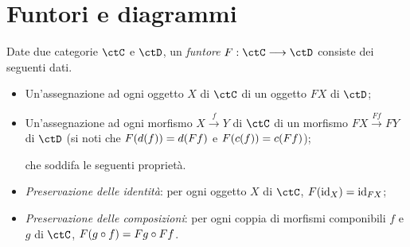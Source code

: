 \section{Funtori e diagrammi}\label{sec_funtori}

\begin{definition}[Funtore]\label{def_funtore}
	Date due categorie \(\ctC\) e \(\ctD\), un \emph{funtore} \(F:\ctC\fun\ctD\) consiste dei seguenti dati.
	\begin{itemize}
		\item Un'assegnazione ad ogni oggetto \(X\) di \(\ctC\) di un oggetto \(FX\) di \(\ctD\);
		\item Un'assegnazione ad ogni morfismo \(X \xrightarrow{f} Y\) di \(\ctC\) di un morfismo \(FX \xrightarrow{Ff} FY\) di \(\ctD\) (si noti che \(F(d(f))=d(Ff)\) e \(F(c(f))=c(Ff)\));

		      che soddifa le seguenti proprietà.
		\item \emph{Preservazione delle identità}: per ogni oggetto \(X\) di \(\ctC\), \(F(\mathrm{id}_X)=\mathrm{id}_{FX}\);
		\item \emph{Preservazione delle composizioni}: per ogni coppia di morfismi componibili \(f\) e \(g\) di \(\ctC\), \(F(g\circ f)=Fg\circ Ff\).
	\end{itemize}
\end{definition}
\begin{example}\label{exa_monotone_funtori}
\end{example}
\begin{example}\label{exa_funtori_da_gruppi}
\end{example}
\begin{example}\label{exa_azioni_funtori}
\end{example}
\begin{example}\label{exa_funtori_da_poset}
\end{example}
\begin{example}\label{ex_hom_funtore}
\end{example}
